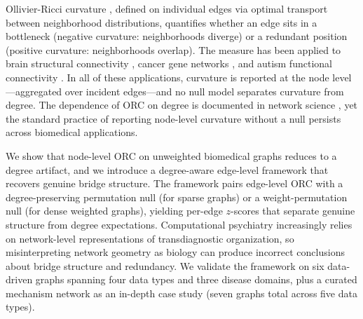 \documentclass[11pt]{article}
\begin{document}
Ollivier-Ricci curvature \citep{ollivier2009ricci}, defined on individual edges via optimal transport between neighborhood distributions, quantifies whether an edge sits in a bottleneck (negative curvature: neighborhoods diverge) or a redundant position (positive curvature: neighborhoods overlap). The measure has been applied to brain structural connectivity \citep{farooq2019network}, cancer gene networks \citep{sandhu2015graph}, and autism functional connectivity \citep{simhal2020measuring, elumalai2022graph}. In all of these applications, curvature is reported at the node level---aggregated over incident edges---and no null model separates curvature from degree. The dependence of ORC on degree is documented in network science \citep{ni2015ricci}, yet the standard practice of reporting node-level curvature without a null persists across biomedical applications.

We show that node-level ORC on unweighted biomedical graphs reduces to a degree artifact, and we introduce a degree-aware edge-level framework that recovers genuine bridge structure. The framework pairs edge-level ORC with a degree-preserving permutation null (for sparse graphs) or a weight-permutation null (for dense weighted graphs), yielding per-edge $z$-scores that separate genuine structure from degree expectations. Computational psychiatry increasingly relies on network-level representations of transdiagnostic organization, so misinterpreting network geometry as biology can produce incorrect conclusions about bridge structure and redundancy. We validate the framework on six data-driven graphs spanning four data types and three disease domains, plus a curated mechanism network as an in-depth case study (seven graphs total across five data types).
\end{document}
